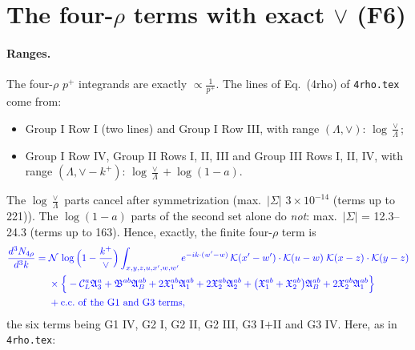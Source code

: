 \documentclass[10pt]{article}
\numberwithin{equation}{section}
\newcommand{\new}[1]{{\color{blue}#1}}
\newcommand{\CL}{\mathcal C_L}
\newcommand{\KK}{\mathcal K}
\newcommand{\NN}{\mathcal N}
\newcommand{\phw}{e^{-ik\cdot(w'-w)}}
\begin{document}
\section{The four-\texorpdfstring{$\rho$}{rho} terms with exact \texorpdfstring{$\vee$}{vee} (F6)}\label{sec:four}
\paragraph{Ranges.} The four-$\rho$ $p^+$ integrands are exactly $\propto\frac{1}{p^+}$. The lines of Eq.~(4rho) of \texttt{4rho.tex} come from:
\begin{itemize}
\item Group I Row I (two lines) and Group I Row III, with range $(\Lambda,\vee)$: $\log\frac{\vee}{\Lambda}$;
\item Group I Row IV, Group II Rows I, II, III and Group III Rows I, II, IV, with range $(\Lambda,\vee-k^+)$: $\log\frac{\vee}{\Lambda}+\log(1-a)$.
\end{itemize}
The $\log\frac{\vee}{\Lambda}$ parts cancel after symmetrization (max.\ $|\Sigma|$ $3\times10^{-14}$ (terms up to 221)). The $\log(1-a)$ parts of the second set alone do \emph{not}: max.\ $|\Sigma|$ = 12.3--24.3 (terms up to 163). Hence, exactly, the finite four-$\rho$ term is
\begin{equation}
\new{\begin{aligned}\frac{d^3N_{4\rho}}{d^3k}={}&\NN\,\log\Big(1-\frac{k^+}{\vee}\Big)\int_{x,y,z,u,x',w,w'}\phw\,\KK(x'-w')\cdot\KK(u-w)\;\KK(x-z)\cdot\KK(y-z)\\
&\times\Big\{-\CL^a\mathfrak A_3^a+\mathfrak B^{ab}\mathfrak A_B^{ab}+2\mathfrak X_1^{ab}\mathfrak A_1^{ab}+2\mathfrak X_2^{ab}\mathfrak A_2^{ab}+\big(\mathfrak X_1^{ab}+\mathfrak X_2^{ab}\big)\mathfrak A_B^{ab}+2\mathfrak X_2^{ab}\mathfrak A_1^{ab}\Big\}\\
&+{\rm c.c.\ of\ the\ G1\ and\ G3\ terms},\end{aligned}}
\label{eq:four}
\end{equation}
the six terms being G1 IV, G2 I, G2 II, G2 III, G3 I$+$II and G3 IV. Here, as in \texttt{4rho.tex}:
\end{document}
